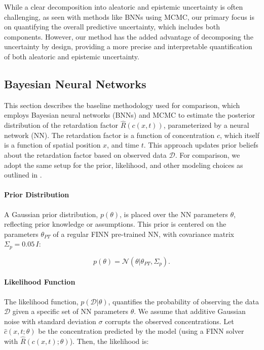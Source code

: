 While a clear decomposition into aleatoric and epistemic uncertainty is often challenging, as seen with methods like BNNs using MCMC, our primary focus is on quantifying the overall predictive uncertainty, which includes both components. However, our method has the added advantage of decomposing the uncertainty by design, providing a more precise and interpretable quantification of both aleatoric and epistemic uncertainty.



\subsection{Bayesian Neural Networks}
\label{sec:bayes_nn}
This section describes the baseline methodology used for comparison, which employs Bayesian neural networks (BNNs) and MCMC to estimate the posterior distribution of the retardation factor $\hat{R}(c(x,t))$, parameterized by a neural network (NN). The retardation factor is a function of concentration $c$, which itself is a function of spatial position $x$, and time $t$. This approach updates prior beliefs about the retardation factor based on observed data $\mathcal{D}$.
For comparison, we adopt the same setup for the prior, likelihood, and other modeling choices as outlined in \cite{finn}.

\paragraph{Prior Distribution}

A Gaussian prior distribution, $p(\theta)$, is placed over the NN parameters $\theta$, reflecting prior knowledge or assumptions. This prior is centered on the parameters $\theta_{PT}$ of a regular FINN pre-trained NN, with covariance matrix $\Sigma_p = 0.05 \, I$:


\begin{equation*}
p(\theta) = \mathcal{N}(\theta | \theta_{PT}, \Sigma_p) .
\end{equation*}

\paragraph{Likelihood Function}

The likelihood function, $p(\mathcal{D} | \theta)$, quantifies the probability of observing the data $\mathcal{D}$ given a specific set of NN parameters $\theta$. We assume that additive Gaussian noise with standard deviation $\sigma$ corrupts the observed concentrations. Let $\hat{c}(x,t;\theta)$ be the concentration predicted by the model (using a FINN solver with $\hat{R}(c(x,t);\theta)$). Then, the likelihood is:

